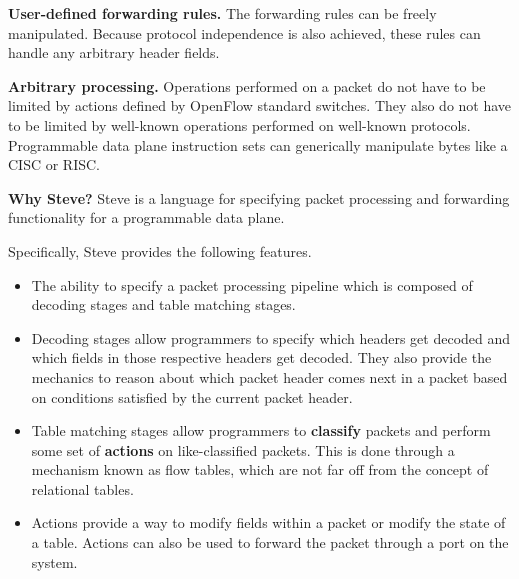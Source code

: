 \textbf{User-defined forwarding rules.} The forwarding rules can be freely manipulated. Because protocol independence is also achieved, these rules can handle any arbitrary header fields. 

\textbf{Arbitrary processing.} Operations performed on a packet do not have to be limited by actions defined by OpenFlow standard switches. They also do not have to be limited by well-known operations performed on well-known protocols. Programmable data plane instruction sets can generically manipulate bytes like a CISC or RISC.

\textbf{Why Steve?} Steve is a language for specifying packet processing and forwarding functionality for a programmable data plane.

Specifically, Steve provides the following features.

\begin{itemize}
\item The ability to specify a packet processing pipeline which is composed of decoding stages and table matching stages.

\item Decoding stages allow programmers to specify which headers get decoded and which fields in those respective headers get decoded. They also provide the mechanics to reason about which packet header comes next in a packet based on conditions satisfied by the current packet header.

\item 
Table matching stages allow programmers to \textbf{classify} packets and perform some set of \textbf{actions} on like-classified packets. This is done through a mechanism known as flow tables, which are not far off from the concept of relational tables.

\item
Actions provide a way to modify fields within a packet or modify the state of a table. Actions can also be used to forward the packet through a port on the system.

\end{itemize}
